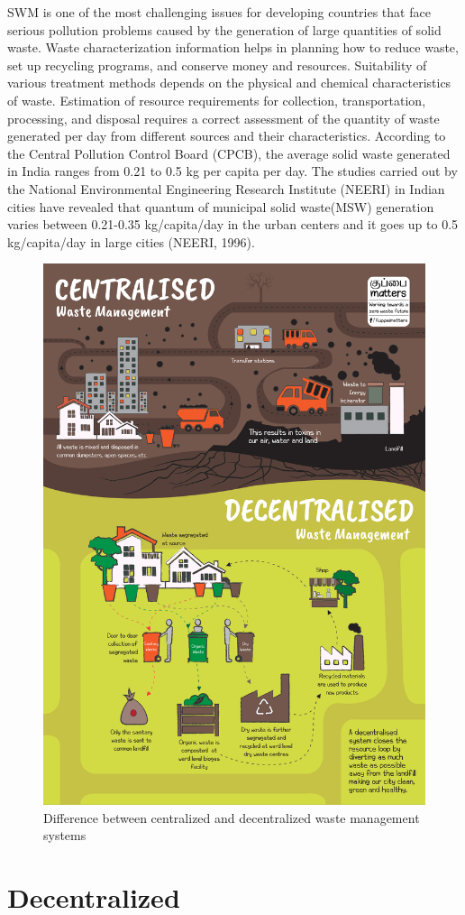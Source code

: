 \documentclass[12pt,a4paper]{report}
\begin{document}
SWM is one of the most challenging issues for developing countries that face serious pollution problems caused by the generation of large quantities of solid waste. Waste characterization information helps in planning how to reduce waste, set up recycling programs, and conserve money and resources. Suitability of various treatment methods depends on the physical and chemical characteristics of waste. Estimation of resource requirements for collection, transportation, processing, and disposal requires a correct assessment of the quantity of waste generated per day from different sources and their characteristics.
According to the Central Pollution Control Board (CPCB), the average solid waste generated in India ranges from 0.21 to 0.5 kg per capita per day.
The studies carried out by the National Environmental Engineering Research Institute (NEERI) in Indian cities have revealed that quantum of municipal solid waste(MSW) generation varies between 0.21-0.35 kg/capita/day in the urban centers and it goes up to 0.5 kg/capita/day in large cities (NEERI, 1996).

\begin{figure}[H]
	\centering
	\includegraphics[width=0.65\linewidth]{cent_decent}
	\caption{Difference between centralized and decentralized waste management systems}
	\label{fig:centdecent}
\end{figure}

\section{Decentralized}
\end{document}
